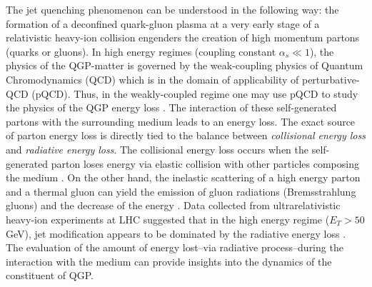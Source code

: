 \documentclass[twocolumn,secnumarabic,amssymb, nobibnotes, aps, prd,10pt]{revtex4-1}
\begin{document}
The jet quenching phenomenon can be understood in the following way: the formation of a deconfined quark-gluon plasma at a very early stage of a relativistic heavy-ion collision engenders the creation of high momentum partons (quarks or gluons). In high energy regimes (coupling constant $\alpha_s\ll 1$), the physics of the QGP-matter is governed by the weak-coupling physics of Quantum Chromodynamics (QCD) \cite{Baier:2000mf,Pasechnik:2016wkt} which is in the domain of applicability of perturbative-QCD (pQCD). Thus, in the weakly-coupled regime one may use pQCD to study the physics of the QGP energy loss \cite{Horowitz:2007su, Bouras:2013una,Shuryak:1983zb}. The interaction of these self-generated partons with the surrounding medium leads to an energy loss. The exact source of parton energy loss is directly tied to the balance between \emph{collisional energy loss} and \emph{radiative energy loss}. The collisional energy loss occurs when the self-generated parton loses energy via elastic collision with other particles composing the medium \cite{Bjorken:1982tu}. On the other hand, the inelastic scattering of a high energy parton and a thermal gluon can yield the emission of gluon radiations (Bremsstrahlung gluons) and the decrease of the energy \cite{Gyulassy:1993hr,Baier:2000mf,Wang:2003mm,Chen:2010te}. Data collected from ultrarelativistic heavy-ion experiments at LHC suggested that in the high energy regime ($E_T>50$ GeV), jet modification appears to be dominated by the radiative energy loss \cite{_hotand, Baier:2000mf}. The evaluation of the amount of energy lost--via radiative process--during the interaction with the medium can provide insights into the dynamics of the constituent of QGP. 
\end{document}
